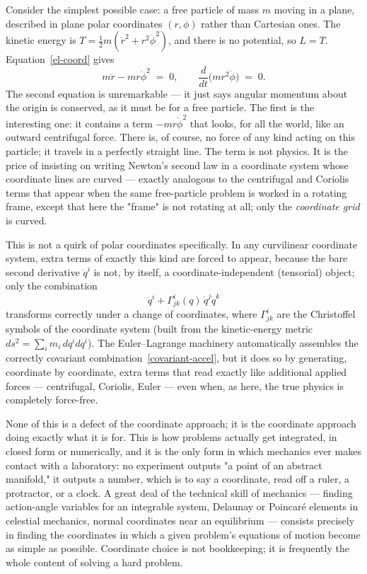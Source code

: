 Consider the simplest possible case: a free particle of mass $m$
moving in a plane, described in plane polar coordinates $(r,\phi)$
rather than Cartesian ones. The kinetic energy is $T =
\tfrac12 m(\dot r^2 + r^2\dot\phi^2)$, and there is no potential, so
$L=T$. Equation~\eqref{el-coord} gives
\begin{equation}
  m\ddot r - m r\dot\phi^2 \;=\; 0,
  \qquad
  \frac{d}{dt}\bigl(m r^2\dot\phi\bigr) \;=\; 0.
  \label{polar-free}
\end{equation}
The second equation is unremarkable --- it just says angular
momentum about the origin is conserved, as it must be for a free
particle. The first is the interesting one: it contains a term
$-mr\dot\phi^2$ that looks, for all the world, like an outward
centrifugal force. There is, of course, no force of any kind acting
on this particle; it travels in a perfectly straight line. The term
is not physics. It is the price of insisting on writing Newton's
second law in a coordinate system whose coordinate lines are
curved --- exactly analogous to the centrifugal and Coriolis terms
that appear when the same free-particle problem is worked in a
rotating frame, except that here the "frame" is not rotating at all;
only the \emph{coordinate grid} is curved.

This is not a quirk of polar coordinates specifically. In any
curvilinear coordinate system, extra terms of exactly this kind are
forced to appear, because the bare second derivative $\ddot q^i$ is
not, by itself, a coordinate-independent (tensorial) object; only the
combination
\begin{equation}
  \ddot q^i + \Gamma^i_{jk}(q)\,\dot q^j\dot q^k
  \label{covariant-accel}
\end{equation}
transforms correctly under a change of coordinates, where $\Gamma^i_{jk}$ are
the Christoffel symbols of the coordinate system (built from the kinetic-energy
metric $ds^2 = \sum_i m_i\,dq^i dq^i$). The Euler--Lagrange machinery
automatically assembles the correctly covariant
combination~\eqref{covariant-accel}, but it does so by generating, coordinate
by coordinate, extra terms that read exactly like additional applied forces ---
centrifugal, Coriolis, Euler --- even when, as here, the true physics is
completely force-free.

None of this is a defect of the coordinate approach; it is the
coordinate approach doing exactly what it is for. This is how
problems actually get integrated, in closed form or numerically, and
it is the only form in which mechanics ever makes contact with a
laboratory: no experiment outputs "a point of an abstract manifold,"
it outputs a number, which is to say a coordinate, read off a ruler,
a protractor, or a clock. A great deal of the technical skill of
mechanics --- finding action-angle variables for an integrable
system, Delaunay or Poincar\'e elements in celestial mechanics,
normal coordinates near an equilibrium --- consists precisely in
finding the coordinates in which a given problem's equations of
motion become as simple as possible. Coordinate choice is not
bookkeeping; it is frequently the whole content of solving a hard
problem.

